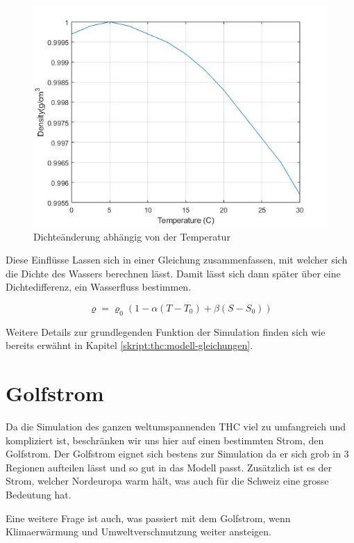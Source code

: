 \begin{figure}
	\centering
	\includegraphics[width=12cm]{thermohalin/Code/graphs/graph_temp.jpg}
	\caption{Dichteänderung abhängig von der Temperatur}
\end{figure}

 Diese Einflüsse Lassen sich in einer Gleichung zusammenfassen, mit welcher sich die Dichte des Wassers berechnen lässt. Damit lässt sich dann später über eine Dichtedifferenz, ein Wasserfluss bestimmen.
 

\begin{equation}
\varrho
=
\varrho_0(1-\alpha(T-T_0)+\beta(S-S_0))
\label{skript:salinity-linear}
\end{equation} 

Weitere Details zur grundlegenden Funktion der Simulation finden sich wie bereits erwähnt in Kapitel \ref{skript:thc:modell-gleichungen}.


\section{Golfstrom}

Da die Simulation des ganzen weltumspannenden THC viel zu umfangreich und kompliziert ist, beschränken wir uns hier auf einen bestimmten Strom, den Golfstrom.
Der Golfstrom eignet sich bestens zur Simulation da er sich grob in 3 Regionen aufteilen lässt und so gut in das Modell passt. Zusätzlich ist es der Strom, welcher Nordeuropa warm hält, was auch für die Schweiz eine grosse Bedeutung hat.

Eine weitere Frage ist auch, was passiert mit dem Golfstrom, wenn Klimaerwärmung und Umweltverschmutzung weiter ansteigen.

